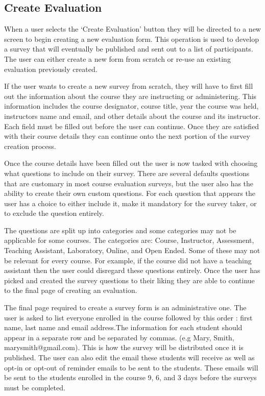 \documentclass{article}
\begin{document}
\subsection{Create Evaluation}
When a user selects the `Create Evaluation' button they will be directed to a new screen to begin creating a new evaluation form. This operation is used to develop a survey that will eventually be published and sent out to a list of participants. The user can either create a new form from scratch or re-use an existing evaluation previously created.

If the user wants to create a new survey from scratch, they will have to first fill out the information about the course they are instructing or administering. This information includes the course designator, course title, year the course was held, instructors name and email, and other details about the course and its instructor. Each field must be filled out before the user can continue. Once they are satisfied with their course details they can continue onto the next portion of the survey creation process.

Once the course details have been filled out the user is now tasked with choosing what questions to include on their survey. There are several defaults questions that are customary in most course evaluation surveys, but the user also has the ability to create their own custom questions. For each question that appears the user has a choice to either include it, make it mandatory for the survey taker, or to exclude the question entirely.

The questions are split up into categories and some categories may not be applicable for some courses. The categories are: Course, Instructor, Assessment, Teaching Assistant, Laboratory, Online, and Open Ended. Some of these may not be relevant for every course. For example, if the course did not have a teaching assistant then the user could disregard these questions entirely. Once the user has picked and created the survey questions to their liking they are able to continue to the final page of creating an evaluation.

The final page required to create a survey form is an administrative one. The user is asked to list everyone enrolled in the course followed by this order : first name, last name and email address.The information for each student should appear in a separate row and be separated by commas. (e.g Mary, Smith, marysmith@gmail.com). This is how the survey will be distributed once it is published. The user can also edit the email these students will receive as well as opt-in or opt-out of reminder emails to be sent to the students. These emails will be sent to the students enrolled in the course 9, 6, and 3 days before the surveys must be completed.
\end{document}

